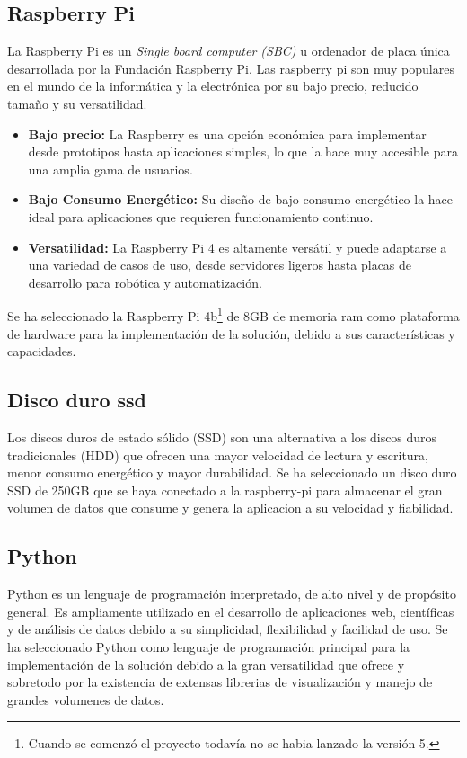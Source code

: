 \subsection{Raspberry Pi}

La Raspberry Pi es un \textit{Single board computer (SBC)} u ordenador de placa única desarrollada por la Fundación Raspberry Pi. Las raspberry pi son muy populares en el mundo de la informática y la electrónica por su bajo precio, reducido tamaño y su versatilidad.

\begin{itemize}
	\item \textbf{Bajo precio:} La Raspberry es una opción económica para implementar desde prototipos hasta aplicaciones simples, lo que la hace muy accesible para una amplia gama de usuarios.
	\item \textbf{Bajo Consumo Energético:} Su diseño de bajo consumo energético la hace ideal para aplicaciones que requieren funcionamiento continuo.
	\item \textbf{Versatilidad:} La Raspberry Pi 4 es altamente versátil y puede adaptarse a una variedad de casos de uso, desde servidores ligeros hasta placas de desarrollo para robótica y automatización.
\end{itemize}
Se ha seleccionado la Raspberry Pi 4b\footnote{Cuando se comenzó el proyecto todavía no se habia lanzado la versión 5.} de 8GB de memoria ram como plataforma de hardware para la implementación de la solución, debido a sus características y capacidades.

\subsection{Disco duro ssd}
Los discos duros de estado sólido (SSD) son una alternativa a los discos duros tradicionales (HDD) que ofrecen una mayor velocidad de lectura y escritura, menor consumo energético y mayor durabilidad. Se ha seleccionado un disco duro SSD de 250GB que se haya conectado a la raspberry-pi para almacenar el gran volumen de datos que consume y genera la aplicacion a su velocidad y fiabilidad.

\subsection{Python}
Python es un lenguaje de programación interpretado, de alto nivel y de propósito general. Es ampliamente utilizado en el desarrollo de aplicaciones web, científicas y de análisis de datos debido a su simplicidad, flexibilidad y facilidad de uso. Se ha seleccionado Python como lenguaje de programación principal para la implementación de la solución debido a la gran versatilidad que ofrece y sobretodo por la existencia de extensas librerias de visualización y manejo de grandes volumenes de datos.

